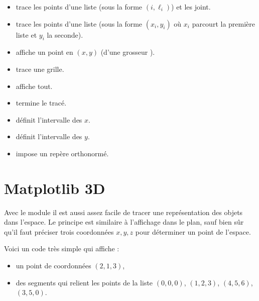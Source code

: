 \documentclass[11pt,class=report,crop=false]{standalone}
\begin{document}
\begin{itemize}
  \item {} trace les points d'une liste (sous la forme $(i,\ell_i)$) et les joint. 
  \item {} trace les points d'une liste (sous la forme $(x_i,y_i)$ où $x_i$ parcourt la première liste et $y_i$ la seconde).    
  \item {} affiche un point en $(x,y)$ (d'une grosseur ).
  \item {} trace une grille.  
  \item {} affiche tout. 
  \item {} termine le tracé.
  
  \item {} définit l'intervalle des $x$.
  \item {} définit l'intervalle des $y$.
  \item {} impose un repère orthonormé.  
\end{itemize}


\section{Matplotlib 3D}

Avec le module  il est aussi assez facile de tracer une représentation des objets dans l'espace.
Le principe est similaire à l'affichage dans le plan, sauf bien sûr qu'il faut préciser trois coordonnées $x,y,z$ pour déterminer un point de l'espace.

\bigskip

Voici un code très simple qui affiche :
\begin{itemize}
	\item un point  de coordonnées $(2,1,3)$,
	\item des segments  qui relient les points de la liste  $(0,0,0)$, $(1,2,3)$, $(4,5,6)$, $(3,5,0)$.
\end{itemize}
\end{document}
